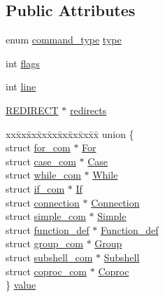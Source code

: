\subsection*{Public Attributes}
\begin{DoxyCompactItemize}
\item 
enum \hyperlink{command_8h_a71e4cb55459005154ad8360914a8e1f4}{command\+\_\+type} \hyperlink{structcommand_adc520136f05efbf94b38913f7d8b1f31}{type}
\item 
int \hyperlink{structcommand_aa901bebf4c7f683f6934e69ad95f2b11}{flags}
\item 
int \hyperlink{structcommand_a35171ddf374dcfc97662a6b3965d2ad0}{line}
\item 
\hyperlink{command_8h_adeb9f5d937c92c7923aec48ad5e47d57}{R\+E\+D\+I\+R\+E\+CT} $\ast$ \hyperlink{structcommand_a5b5efa4854e0319791e28028712fee9a}{redirects}
\item 
\begin{tabbing}
xx\=xx\=xx\=xx\=xx\=xx\=xx\=xx\=xx\=\kill
union \{\\
\>struct \hyperlink{structfor__com}{for\_com} $\ast$ \hyperlink{structcommand_a7b937c91d8eacc73c93c1cf64422dc28}{For}\\
\>struct \hyperlink{structcase__com}{case\_com} $\ast$ \hyperlink{structcommand_a3b14b45192764ae24f9c40edf7aefc94}{Case}\\
\>struct \hyperlink{structwhile__com}{while\_com} $\ast$ \hyperlink{structcommand_a770073860411c3d15cc533862688d035}{While}\\
\>struct \hyperlink{structif__com}{if\_com} $\ast$ \hyperlink{structcommand_a7ebce7bca0b62a919f8ad0157046a58c}{If}\\
\>struct \hyperlink{structconnection}{connection} $\ast$ \hyperlink{structcommand_a2d2ed612574d67c6d3d83892595563f5}{Connection}\\
\>struct \hyperlink{structsimple__com}{simple\_com} $\ast$ \hyperlink{structcommand_ab3ddc136c7f74d323c4bd1afc97a5864}{Simple}\\
\>struct \hyperlink{structfunction__def}{function\_def} $\ast$ \hyperlink{structcommand_a0f27ea57892789c32125560aa6b58372}{Function\_def}\\
\>struct \hyperlink{structgroup__com}{group\_com} $\ast$ \hyperlink{structcommand_a3be5f23cdfe7367575228ab7c8a98c8a}{Group}\\
\>struct \hyperlink{structsubshell__com}{subshell\_com} $\ast$ \hyperlink{structcommand_a31087dc3fce667d2ded99e645149afa6}{Subshell}\\
\>struct \hyperlink{structcoproc__com}{coproc\_com} $\ast$ \hyperlink{structcommand_a2b7939e2744dc3a05722a9982148b219}{Coproc}\\
\} \hyperlink{structcommand_adda5d5d9646a55d8cf1f8b64612af756}{value}\\

\end{tabbing}\end{DoxyCompactItemize}


